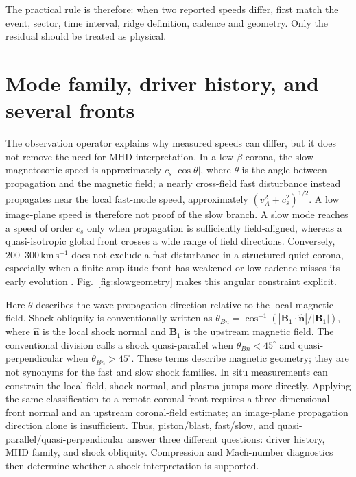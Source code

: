 \documentclass[11pt]{article}
\let\parencite\citep
\newcommand{\kms}{\mathrm{km\,s^{-1}}}
\begin{document}
The practical rule is therefore: when two reported speeds differ, first match the event, sector, time interval, ridge definition, cadence and geometry. Only the residual should be treated as physical.

\section{Mode family, driver history, and several fronts}
\label{sec:modes}
The observation operator explains why measured speeds can differ, but it does not remove the need for MHD interpretation. In a low-$\beta$ corona, the slow magnetosonic speed is approximately $c_s|\cos\theta|$, where $\theta$ is the angle between propagation and the magnetic field; a nearly cross-field fast disturbance instead propagates near the local fast-mode speed, approximately $(v_A^2+c_s^2)^{1/2}$. A low image-plane speed is therefore not proof of the slow branch. A slow mode reaches a speed of order $c_s$ only when propagation is sufficiently field-aligned, whereas a quasi-isotropic global front crosses a wide range of field directions. Conversely, $200$--$300\,\kms$ does not exclude a fast disturbance in a structured quiet corona, especially when a finite-amplitude front has weakened or low cadence misses its early evolution \parencite{WillsDavey2007,Warmuth2015}. Fig.~\ref{fig:slowgeometry} makes this angular constraint explicit.

Here $\theta$ describes the wave-propagation direction relative to the local magnetic field. Shock obliquity is conventionally written as $\theta_{Bn}=\cos^{-1}(|\mathbf{B}_1\mathbin{\cdot}\hat{\mathbf{n}}|/|\mathbf{B}_1|)$, where $\hat{\mathbf{n}}$ is the local shock normal and $\mathbf{B}_1$ is the upstream magnetic field. The conventional division calls a shock quasi-parallel when $\theta_{Bn}<45^\circ$ and quasi-perpendicular when $\theta_{Bn}>45^\circ$. These terms describe magnetic geometry; they are not synonyms for the fast and slow shock families. In situ measurements can constrain the local field, shock normal, and plasma jumps more directly. Applying the same classification to a remote coronal front requires a three-dimensional front normal and an upstream coronal-field estimate; an image-plane propagation direction alone is insufficient. Thus, piston/blast, fast/slow, and quasi-parallel/quasi-perpendicular answer three different questions: driver history, MHD family, and shock obliquity. Compression and Mach-number diagnostics then determine whether a shock interpretation is supported.
\end{document}
